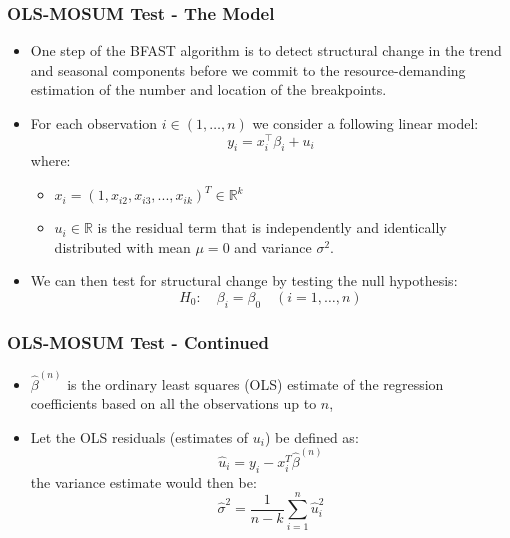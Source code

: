 \documentclass[presentation.tex]{subfiles}
\begin{document}
\begin{frame}
\frametitle{OLS-MOSUM Test - The Model}
\begin{itemize}
  \item One step of the BFAST algorithm is to detect structural change in the
    trend and seasonal components before we commit to the resource-demanding
    estimation of the number and location of the breakpoints.
  \item For each observation $i \in (1, \ldots, n)$ we consider a following linear model:
    \[
    y_{i}=x_{i}^{\top} \beta_{i}+u_{i}
    \]
    where:
    \begin{itemize}
    \item $x_i = (1,x_{i2}, x_{i3}, ..., x_{ik})^T \in \mathbb{R}^k$
    \item $u_i \in \mathbb{R}$ is the residual term that is independently and identically
      distributed with mean $\mu = 0$ and variance $\sigma^2$.
    \end{itemize}
  \item 
    We can then test for structural change by testing the null hypothesis:
    \[
    H_0:\quad \beta_i = \beta_0 \quad(i=1, \ldots, n)
    \]
\end{itemize}
\end{frame}

\begin{frame}
  \frametitle{OLS-MOSUM Test - Continued}
  \begin{itemize}
  \item $\hat{\beta}^{(n)}$ is the ordinary least squares (OLS) estimate of the
    regression coefficients based on all the observations up to $n$,
  \item 
    Let the OLS residuals (estimates of $u_i$) be defined as:
    \begin{equation} \label{eq:residuals}
      \hat{u}_i = y_i - x_i^T\hat{\beta}^{(n)}
    \end{equation}
    the variance estimate would then be:
    \begin{equation} \label{eq:sigma}
      \hat{\sigma}^{2}=\frac{1}{n-k} \sum_{i=1}^{n} \hat{u}_{i}^{2}
    \end{equation}
  \end{itemize} 
\end{frame}
\end{document}

